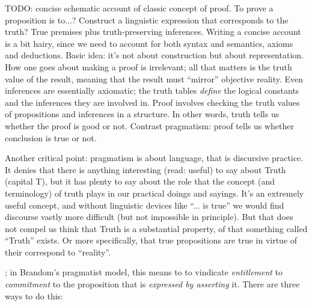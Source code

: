 \begin{ednote}
  TODO: concise schematic account of classic concept of proof.  To
  prove a proposition is to...?  Construct a linguistic expression
  that corresponds to the truth?  True premises plus truth-preserving
  inferences.  Writing a concise account is a bit hairy, since we need
  to account for both syntax and semantics, axioms and deductions.
  Basic idea: it's not about construction but about representation.
  How one goes about making a proof is irrelevant; all that matters is
  the truth value of the result, meaning that the result must
  ``mirror'' objective reality.  Even inferences are essentially
  axiomatic; the truth tables \emph{define} the logical constants and
  the inferences they are involved in.  Proof involves checking the
  truth values of propositions and inferences in a structure.  In
  other words, truth tells us whether the proof is good or not.
  Contrast pragmatism: proof tells us whether conclusion is true or
  not.
\end{ednote}

\begin{ednote}
  Another critical point: pragmatism is about language, that is
  discursive practice.  It denies that there is anything interesting
  (read: useful) to say about Truth (capital T), but it has plenty to
  say about the role that the concept (and terminology) of truth plays
  in our practical doings and sayings.  It's an extremely useful
  concept, and without linguistic devices like ``... is true'' we
  would find discourse vastly more difficult (but not impossible in
  principle).  But that does not compel us think that Truth is a
  substantial property, of that something called ``Truth'' exists.  Or
  more specifically, that true propositions are true in virtue of
  their correspond to ``reality''.
\end{ednote}

; in Brandom's
pragmatist model, this means to to vindicate \emph{entitlement} to
\emph{commitment} to the proposition that is \emph{expressed by
  asserting} it.  There are three ways to do this:

